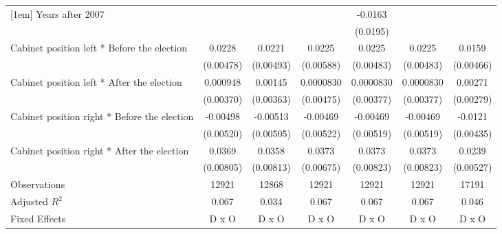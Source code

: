 \begin{table}[htbp]
\begin{tabular}{l*{6}{c}}
[1em]
Years after 2007    &                     &                     &                     &     -0.0163         &                     &                     \\
                    &                     &                     &                     &    (0.0195)         &                     &                     \\
[1em]
Cabinet position left * Before the election&      0.0228\sym{***}&      0.0221\sym{***}&      0.0225\sym{***}&      0.0225\sym{***}&      0.0225\sym{***}&      0.0159\sym{**} \\
                    &   (0.00478)         &   (0.00493)         &   (0.00588)         &   (0.00483)         &   (0.00483)         &   (0.00466)         \\
[1em]
Cabinet position left * After the election&    0.000948         &     0.00145         &   0.0000830         &   0.0000830         &   0.0000830         &     0.00271         \\
                    &   (0.00370)         &   (0.00363)         &   (0.00475)         &   (0.00377)         &   (0.00377)         &   (0.00279)         \\
[1em]
Cabinet position right * Before the election&    -0.00498         &    -0.00513         &    -0.00469         &    -0.00469         &    -0.00469         &     -0.0121\sym{**} \\
                    &   (0.00520)         &   (0.00505)         &   (0.00522)         &   (0.00519)         &   (0.00519)         &   (0.00435)         \\
[1em]
Cabinet position right * After the election&      0.0369\sym{***}&      0.0358\sym{***}&      0.0373\sym{***}&      0.0373\sym{***}&      0.0373\sym{***}&      0.0239\sym{***}\\
                    &   (0.00805)         &   (0.00813)         &   (0.00675)         &   (0.00823)         &   (0.00823)         &   (0.00527)         \\
\hline
Observations        &       12921         &       12868         &       12921         &       12921         &       12921         &       17191         \\
Adjusted \(R^{2}\)  &       0.067         &       0.034         &       0.067         &       0.067         &       0.067         &       0.046         \\
Fixed Effects       &       D x O         &       D x O         &       D x O         &       D x O         &       D x O         &       D x O         \\

\end{tabular}
\end{table}
